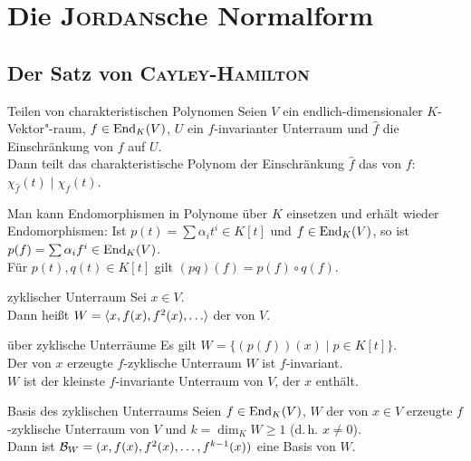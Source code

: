 \chapter{%
    Die \textsc{Jordan}sche Normalform%
}

\section{%
    Der Satz von \textsc{Cayley}-\textsc{Hamilton}%
}

\begin{Satz}{Teilen von charakteristischen Polynomen}
    Seien $V$ ein endlich-dimensionaler $K$-Vektor"-raum, $f \in \operatorname{End}_K(V)$,
    $U$ ein $f$-invarianter Unterraum und $\widehat{f}$ die Einschränkung
    von $f$ auf $U$. \\
    Dann teilt das charakteristische Polynom der Einschränkung $\widehat{f}$
    das von $f$:
    $\chi_{\widehat{f}}(t) \;|\; \chi_f(t)$.
\end{Satz}

\begin{Bem}
    Man kann Endomorphismen in Polynome über $K$ einsetzen und erhält
    wieder Endomorphismen:
    Ist $p(t) = \sum \alpha_i t^i \in K[t]$ und $f \in \operatorname{End}_K(V)$,
    so ist $p(f) = \sum \alpha_i f^i \in \operatorname{End}_K(V)$. \\
    Für $p(t), q(t) \in K[t]$ gilt $(pq)(f) = p(f) \circ q(f)$.
\end{Bem}

\begin{Def}{zyklischer Unterraum}
    Sei $x \in V$. \\
    Dann heißt $W = \aufspann{x, f(x), f^2(x), \dotsc}$
    der  von $V$.
\end{Def}

\begin{Lemma}{über zyklische Unterräume}
    Es gilt $W = \{(p(f))(x) \;|\; p \in K[t]\}$. \\
    Der von $x$ erzeugte $f$-zyklische Unterraum $W$ ist $f$-invariant. \\
    $W$ ist der kleinste $f$-invariante Unterraum von $V$, der $x$ enthält.
\end{Lemma}

\begin{Satz}{Basis des zyklischen Unterraums}
    Seien $f \in \operatorname{End}_K(V)$, $W$ der von $x \in V$ erzeugte $f$-zyklische
    Unterraum von $V$ und $k = \dim_K W \ge 1$ (d.\,h. $x \not= 0$). \\
    Dann ist $\mathcal{B}_W = (x, f(x), f^2(x), \dotsc, f^{k-1}(x))$ eine
    Basis von $W$.
\end{Satz}

